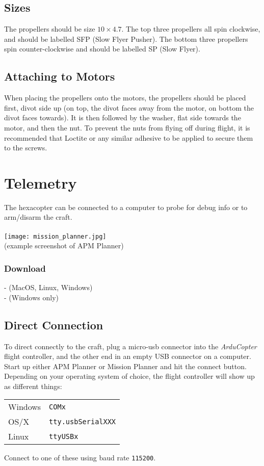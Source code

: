 \documentclass{style}
\begin{document}
\subsection{Sizes}
The propellers should be size $10\times4.7$.  The top three propellers all spin clockwise, and should be labelled SFP (Slow Flyer Pusher).  The bottom three propellers spin counter-clockwise and should be labelled SP (Slow Flyer).
\subsection{Attaching to Motors}
When placing the propellers onto the motors, the propellers should be placed first, divot side up (on top, the divot faces away from the motor, on bottom the divot faces towards).
It is then followed by the washer, flat side towards the motor, and then the nut.
To prevent the nuts from flying off during flight, it is recommended that Loctite or any similar adhesive to be applied to secure them to the screws.
\section{Telemetry}
The hexacopter can be connected to a computer to probe for debug info or to arm/disarm the craft. \\ \\
\texttt{[image: mission\_planner.jpg]} \\
(example screenshot of APM Planner)
\subsubsection{Download}
 - (MacOS, Linux, Windows) \\
 - (Windows only)
\subsection{Direct Connection}
To direct connectly to the craft, plug a micro-usb connector into the \textit{ArduCopter} flight controller, and the other end in an empty USB connector on a computer.
Start up either APM Planner or Mission Planner and hit the connect button.
Depending on your operating system of choice, the flight controller will show up as different things:
\newline
\newline
\begin{tabular}{ l l }
  Windows & \texttt{COMx} \\
  OS/X & \texttt{tty.usbSerialXXX} \\
  Linux & \texttt{ttyUSBx}
\end{tabular}
\newline
\newline
Connect to one of these using baud rate \texttt{115200}.
\end{document}

